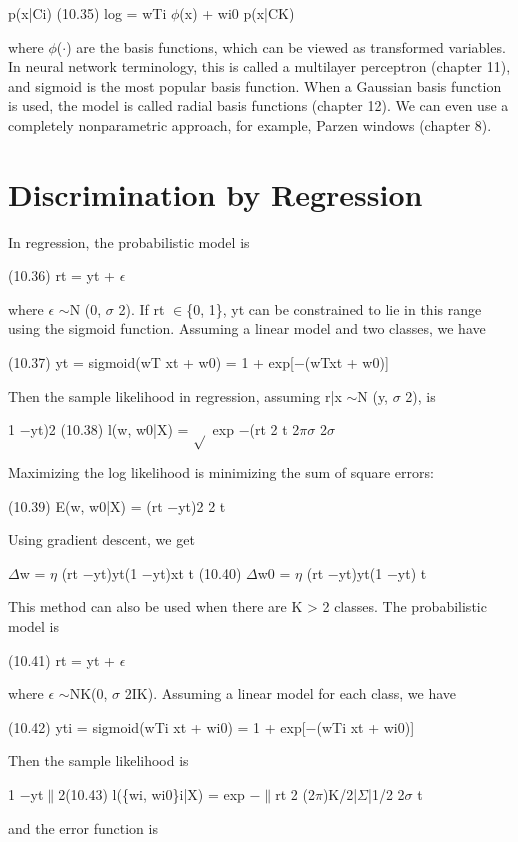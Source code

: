 p(x|Ci) (10.35) log = wTi $\phi$(x) + wi0 p(x|CK)

where $\phi$($\cdot$) are the basis functions, which can be viewed as transformed variables. In neural network terminology, this is called a multilayer perceptron (chapter 11), and sigmoid is the most popular basis function. When a Gaussian basis function is used, the model is called radial basis functions (chapter 12). We can even use a completely nonparametric approach, for example, Parzen windows (chapter 8).

\section{Discrimination by Regression}

In regression, the probabilistic model is

(10.36) rt = yt + $\epsilon$

where $\epsilon$ $\sim$N (0, $\sigma$ 2). If rt $\in$\{0, 1\}, yt can be constrained to lie in this range using the sigmoid function. Assuming a linear model and two classes, we have

(10.37) yt = sigmoid(wT xt + w0) = 1 + exp[$-$(wTxt + w0)]

Then the sample likelihood in regression, assuming r|x $\sim$N (y, $\sigma$ 2), is

1 $-$yt)2 (10.38) l(w, w0|X) = $\sqrt{}$ exp $-$(rt 2 t 2$\pi$$\sigma$ 2$\sigma$

Maximizing the log likelihood is minimizing the sum of square errors:

(10.39) E(w, w0|X) = (rt $-$yt)2 2 t

Using gradient descent, we get

$\Delta$w = $\eta$ (rt $-$yt)yt(1 $-$yt)xt t (10.40) $\Delta$w0 = $\eta$ (rt $-$yt)yt(1 $-$yt) t

This method can also be used when there are K > 2 classes. The probabilistic model is

(10.41) rt = yt + $\epsilon$

where $\epsilon$ $\sim$NK(0, $\sigma$ 2IK). Assuming a linear model for each class, we have

(10.42) yti = sigmoid(wTi xt + wi0) = 1 + exp[$-$(wTi xt + wi0)]

Then the sample likelihood is

1 $-$yt$\parallel$2(10.43) l(\{wi, wi0\}i|X) = exp $-$$\parallel$rt 2 (2$\pi$)K/2|$\Sigma$|1/2 2$\sigma$ t

and the error function is

